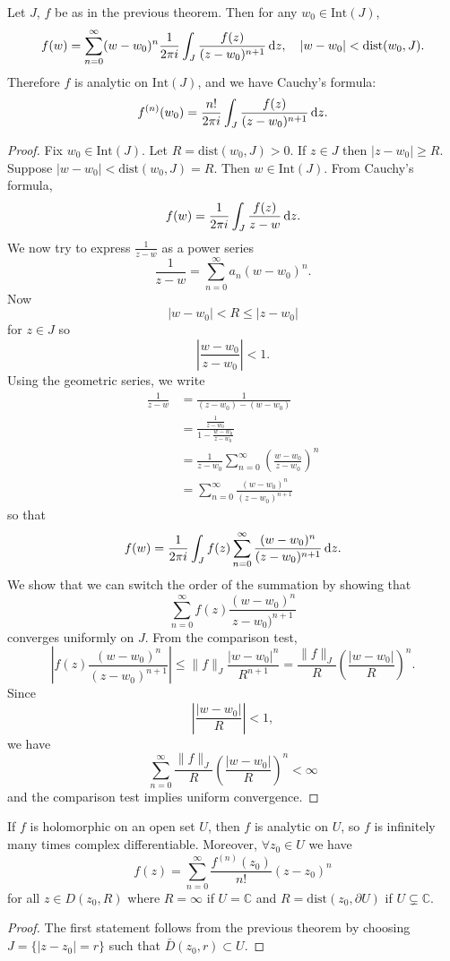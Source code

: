 \begin{theorem}
Let $J$, $f$ be as in the previous theorem. Then for any
$w_0 \in \mathrm{Int}(J)$,
$$
f(w) =
\sum_{n=0}^\infty
  (w - w_0)^n
  \frac{1}{2 \pi i}
  \int_J
    \frac{f(z)}{(z - w_0)^{n+1}}
    \mathop{}\!\mathrm{d} z, \quad
|w - w_0| < \mathrm{dist}(w_0, J).
$$
Therefore $f$ is analytic on $\mathrm{Int}(J)$, and
we have Cauchy's formula:
$$
f^{(n)}(w_0) =
\frac{n!}{2 \pi i}
\int_J
  \frac{f(z)}{(z - w_0)^{n+1}}
  \mathop{}\!\mathrm{d} z.
$$
\end{theorem}
\begin{proof}
Fix $w_0 \in \mathrm{Int}(J)$. Let $R = \mathrm{dist}(w_0, J) > 0$.
If $z \in J$ then $|z - w_0| \geq R$. Suppose
$|w - w_0| < \mathrm{dist}(w_0, J) = R$. Then
$w \in \mathrm{Int}(J)$. From Cauchy's formula,
$$
f(w) = \frac{1}{2 \pi i} \int_J \frac{f(z)}{z - w} \mathop{}\!\mathrm{d} z.
$$
We now try to express $\frac{1}{z - w}$ as a power series
$$
\frac{1}{z - w} = \sum_{n=0}^\infty a_n (w - w_0)^n.
$$
Now
$$
|w - w_0| < R \leq |z - w_0|
$$
for $z \in J$ so
$$
\left|\frac{w - w_0}{z - w_0}\right| < 1.
$$
Using the geometric series, we write
\begin{align*}
   \frac{1}{z - w}
&= \frac{1}{(z - w_0) - (w - w_0)} \\
&= \frac{\frac{1}{z - w_0}}{1 - \frac{w - w_0}{z - w_0}} \\
&= \frac{1}{z - w_0}
   \sum_{n=0}^\infty
     \left(
       \frac{w - w_0}{z - w_0}
     \right)^n \\
&= \sum_{n=0}^\infty
     \frac{(w - w_0)^n}{(z - w_0)^{n+1}}
\end{align*}
so that
$$
f(w) =
\frac{1}{2 \pi i}
\int_J
  f(z)
  \sum_{n=0}^\infty
    \frac{(w - w_0)^n}{(z - w_0)^{n+1}}
    \mathop{}\!\mathrm{d} z.
$$
We show that we can switch the order of the summation
by showing that
$$
\sum_{n=0}^\infty f(z) \frac{(w - w_0)^n}{z - w_0)^{n+1}}
$$
converges uniformly on $J$.
From the comparison test,
$$
\left|
  f(z) \frac{(w - w_0)^n}{(z - w_0)^{n+1}}
\right|
\leq
\| f \|_J
\frac{|w - w_0|^n}{R^{n+1}}
=
\frac{\| f \|_J}{R}
\left(\frac{|w - w_0|}{R}\right)^n.
$$
Since
$$
\left|
  \frac{|w - w_0|}{R}
\right|
< 1,
$$
we have
$$
\sum_{n=0}^\infty
  \frac{\| f \|_J}{R}
  \left(\frac{|w - w_0|}{R}\right)^n
< \infty
$$
and the comparison test implies uniform convergence.
\end{proof}

\begin{corol}
If $f$ is holomorphic on an open set $U$, then $f$ is analytic on $U$,
so $f$ is infinitely many times complex differentiable. Moreover,
$\forall z_0 \in U$ we have
$$
f(z) = \sum_{n=0}^\infty \frac{f^{(n)}(z_0)}{n!} (z - z_0)^n
$$
for all $z \in D(z_0, R)$ where $R = \infty$ if $U = \mathbb{C}$ and
$R = \mathrm{dist}(z_0, \partial U)$ if $U \subsetneq \mathbb{C}$.
\end{corol}

\begin{proof}
The first statement follows from the previous theorem by choosing
$J = \{ |z - z_0| = r \}$ such that $\bar{D}(z_0, r) \subset U$.
\end{proof}
